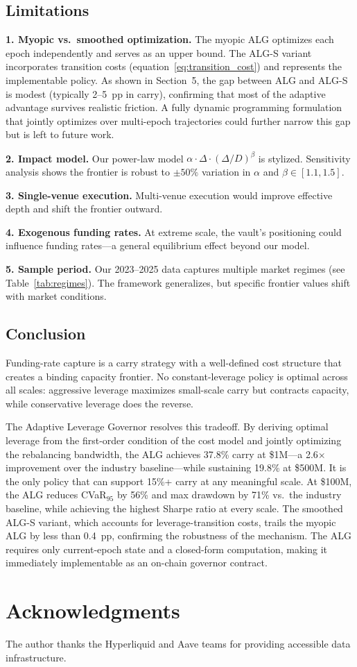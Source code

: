 \documentclass[11pt]{article}
\begin{document}
\subsection{Limitations}

\textbf{1. Myopic vs.\ smoothed optimization.} The myopic ALG optimizes each epoch independently and serves as an upper bound. The ALG-S variant incorporates transition costs (equation~\ref{eq:transition_cost}) and represents the implementable policy. As shown in Section~5, the gap between ALG and ALG-S is modest (typically 2--5~pp in carry), confirming that most of the adaptive advantage survives realistic friction. A fully dynamic programming formulation that jointly optimizes over multi-epoch trajectories could further narrow this gap but is left to future work.

\textbf{2. Impact model.} Our power-law model $\alpha \cdot \Delta \cdot (\Delta/D)^\beta$ is stylized. Sensitivity analysis shows the frontier is robust to $\pm 50\%$ variation in $\alpha$ and $\beta \in [1.1, 1.5]$.

\textbf{3. Single-venue execution.} Multi-venue execution would improve effective depth and shift the frontier outward.

\textbf{4. Exogenous funding rates.} At extreme scale, the vault's positioning could influence funding rates---a general equilibrium effect beyond our model.

\textbf{5. Sample period.} Our 2023--2025 data captures multiple market regimes (see Table~\ref{tab:regimes}). The framework generalizes, but specific frontier values shift with market conditions.

\subsection{Conclusion}

Funding-rate capture is a carry strategy with a well-defined cost structure that creates a binding capacity frontier. No constant-leverage policy is optimal across all scales: aggressive leverage maximizes small-scale carry but contracts capacity, while conservative leverage does the reverse.

The Adaptive Leverage Governor resolves this tradeoff. By deriving optimal leverage from the first-order condition of the cost model and jointly optimizing the rebalancing bandwidth, the ALG achieves 37.8\% carry at \$1M---a 2.6$\times$ improvement over the industry baseline---while sustaining 19.8\% at \$500M. It is the only policy that can support 15\%+ carry at any meaningful scale. At \$100M, the ALG reduces CVaR$_{95}$ by 56\% and max drawdown by 71\% vs.\ the industry baseline, while achieving the highest Sharpe ratio at every scale. The smoothed ALG-S variant, which accounts for leverage-transition costs, trails the myopic ALG by less than 0.4~pp, confirming the robustness of the mechanism. The ALG requires only current-epoch state and a closed-form computation, making it immediately implementable as an on-chain governor contract.

\section*{Acknowledgments}

The author thanks the Hyperliquid and Aave teams for providing accessible data infrastructure.



\end{document}
